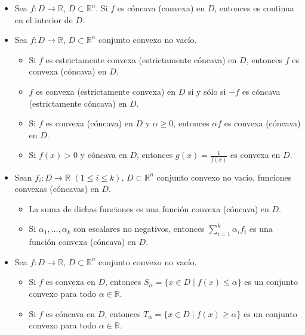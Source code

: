 \begin{Propty} 
\begin{itemize}
\item[i) ] Sea $f : D \to \mathbb{R}$, $D \subset \mathbb{R}^n$.  
Si $f$ es c\'oncava (convexa) en $D$, entonces es continua en el interior de $D$.

\item[ii) ] Sea $f : D \to \mathbb{R}$, $D \subset \mathbb{R}^n$ conjunto convexo no vac\'io.
\begin{itemize}
\item[a) ] Si $f$ es estrictamente convexa (estrictamente c\'oncava) en $D$, entonces $f$ es convexa (c\'oncava) en $D$.

\item[b) ] $f$ es convexa (estrictamente convexa) en $D$ si y s\'olo si $-f$ es c\'oncava (estrictamente c\'oncava) en $D$.

\item[c) ] Si $f$ es convexa (c\'oncava) en $D$ y $\alpha \ge 0$, entonces $\alpha f$ es convexa (c\'oncava) en $D$.

\item[d) ] Si $f(x) > 0$ y c\'oncava en $D$, entonces
$g(x) = \frac{1}{f(x)}$ es convexa en $D$.
\end{itemize}

\item[iii) ] Sean $f_i : D \to \mathbb{R}$ $(1 \leq i \leq k)$, $D \subset \mathbb{R}^n$ conjunto convexo no vac\'io, funciones convexas (c\'oncavas) en $D$.
\begin{itemize}
\item[a) ] La suma de dichas funciones es una funci\'on convexa (c\'oncava) en $D$.

\item[b) ] Si $\alpha_1, \ldots, \alpha_k$ son escalares no negativos, entonces $\sum_{i=1}^k \alpha_i f_i$ es una funci\'on convexa (c\'oncava) en $D$.
\end{itemize}

\item[iv) ] Sea $f : D \to \mathbb{R}$, $D \subset \mathbb{R}^n$ conjunto convexo no vac\'io.
\begin{itemize}
\item[a) ] Si $f$ es convexa en $D$, entonces $S_\alpha = \{x \in D \mid f(x) \le \alpha\}$
es un conjunto convexo para todo $\alpha \in \mathbb{R}$.

\item[b) ] Si $f$ es c\'oncava en $D$, entonces $T_\alpha = \{x \in D \mid f(x) \ge \alpha\}$
es un conjunto convexo para todo $\alpha \in \mathbb{R}$.
\end{itemize}


\end{itemize}
\end{Propty}
